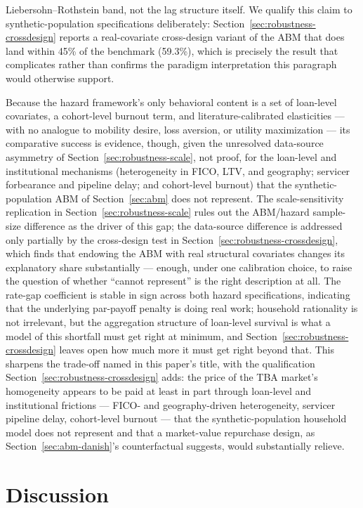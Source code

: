 \documentclass[12pt]{article}
\begin{document}
Liebersohn--Rothstein band, not the lag structure itself. We qualify this claim to synthetic-population specifications deliberately: Section~\ref{sec:robustness-crossdesign} reports a real-covariate cross-design variant of the ABM that does land within 45\% of the benchmark (59.3\%), which is precisely the result that complicates rather than confirms the paradigm interpretation this paragraph would otherwise support.

Because the hazard framework's only behavioral content is a set of loan-level covariates, a cohort-level burnout term, and literature-calibrated elasticities --- with no analogue to mobility desire, loss aversion, or utility maximization --- its comparative success is evidence, though, given the unresolved data-source asymmetry of Section~\ref{sec:robustness-scale}, not proof, for the loan-level and institutional mechanisms (heterogeneity in FICO, LTV, and geography; servicer forbearance and pipeline delay; and cohort-level burnout) that the synthetic-population ABM of Section~\ref{sec:abm} does not represent. The scale-sensitivity replication in Section~\ref{sec:robustness-scale} rules out the ABM/hazard sample-size difference as the driver of this gap; the data-source difference is addressed only partially by the cross-design test in Section~\ref{sec:robustness-crossdesign}, which finds that endowing the ABM with real structural covariates changes its explanatory share substantially --- enough, under one calibration choice, to raise the question of whether ``cannot represent'' is the right description at all. The rate-gap coefficient is stable in sign across both hazard specifications, indicating that the underlying par-payoff penalty is doing real work; household rationality is not irrelevant, but the aggregation structure of loan-level survival is what a model of this shortfall must get right at minimum, and Section~\ref{sec:robustness-crossdesign} leaves open how much more it must get right beyond that. This sharpens the trade-off named in this paper's title, with the qualification Section~\ref{sec:robustness-crossdesign} adds: the price of the TBA market's homogeneity appears to be paid at least in part through loan-level and institutional frictions --- FICO- and geography-driven heterogeneity, servicer pipeline delay, cohort-level burnout --- that the synthetic-population household model does not represent and that a market-value repurchase design, as Section~\ref{sec:abm-danish}'s counterfactual suggests, would substantially relieve.

\section{Discussion}\label{sec:discussion}
\end{document}

